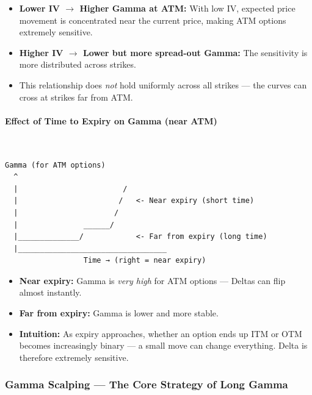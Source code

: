 \documentclass[12pt,openany]{book}
\begin{document}
\begin{itemize}[leftmargin=*]
    \item \textbf{Lower IV \(\rightarrow\) Higher Gamma at ATM:} With low IV, expected price movement is concentrated near the current price, making ATM options extremely sensitive.
    \item \textbf{Higher IV \(\rightarrow\) Lower but more spread-out Gamma:} The sensitivity is more distributed across strikes.
    \item This relationship does \emph{not} hold uniformly across all strikes — the curves can cross at strikes far from ATM.
\end{itemize}

\newpage

\paragraph{Effect of Time to Expiry on Gamma (near ATM)}\mbox{}\\

\begin{center}
\begin{Verbatim}[fontsize=\small,breaklines=true]
Gamma (for ATM options)
  ^
  |                        /
  |                       /   <- Near expiry (short time)
  |                      /
  |               ______/
  |______________/            <- Far from expiry (long time)
  |__________________________________
                  Time → (right = near expiry)
\end{Verbatim}
\end{center}

\begin{itemize}[leftmargin=*]
    \item \textbf{Near expiry:} Gamma is \emph{very high} for ATM options — Deltas can flip almost instantly.
    \item \textbf{Far from expiry:} Gamma is lower and more stable.
    \item \textbf{Intuition:} As expiry approaches, whether an option ends up ITM or OTM becomes increasingly binary — a small move can change everything. Delta is therefore extremely sensitive.
\end{itemize}

\subsubsection{Gamma Scalping — The Core Strategy of Long Gamma}
\end{document}
